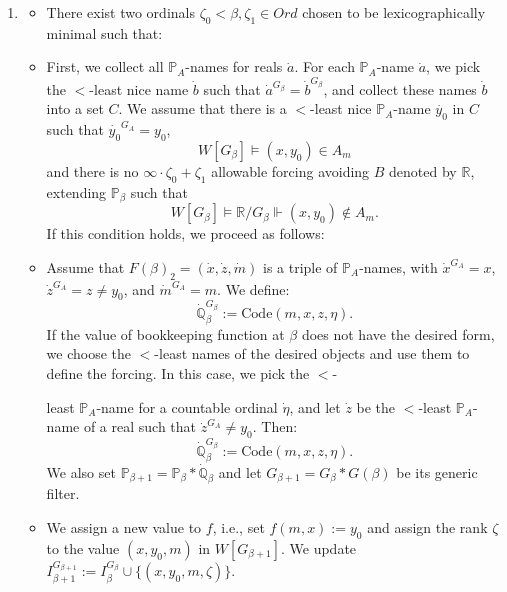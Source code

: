 \documentclass[a4paper,11pt]{article}
\newcommand{\forceP}{\mathbb{P}}
\newcommand{\forceQ}{\mathbb{Q}}
\newcommand{\forceR}{\mathbb{R}}
\begin{document}
   \begin{enumerate}
\item[(a)]  
  \begin{itemize}
  \item[] There exist two ordinals  \(\zeta_0< \beta, \zeta_1 \in Ord\) chosen to be lexicographically minimal such that:
  \item[] First, we collect all \( \forceP_A \)-names for reals \( \dot{a} \). For each \( \forceP_A \)-name \( \dot{a} \), we pick the \( < \)-least nice name \( \dot{b} \) such that \( \dot{a}^{G_{\beta}} = \dot{b}^{G_{\beta}} \), and collect these names \( \dot{b} \) into a set \( C \). We assume that there is a \( < \)-least nice \( \forceP_A \)-name \( \dot{y_0} \) in \( C \) such that \( \dot{y_0}^{G_A} = y_0 \), 
  \[
  W[G_{\beta}] \models (x, y_0) \in A_m
  \]
  and there is no \( \infty \cdot \zeta_0 + \zeta_1\) \-allowable forcing avoiding $B$ denoted by \( \forceR \), extending \( \forceP_{\beta} \)  such that 
  \[
  W[G_{\beta}] \models \forceR / G_{\beta} \Vdash (x, y_0) \notin A_m.
  \]
  If this condition holds, we proceed as follows:
  \end{itemize}

  \begin{itemize}
  \item Assume that \( F(\beta)_2 = (\dot{x}, \dot{z}, \dot{m}) \) is a triple of \( \forceP_A \)-names, with \( \dot{x}^{G_A} = x \), \( \dot{z}^{G_A} = z \neq y_0 \), and \( \dot{m}^{G_A} = m \). We define:
  \[
  \dot{\forceQ}_{\beta}^{G_{\beta}} := \text{Code}(m,x,z,\eta).
  \]
  If the value of bookkeeping function at $\beta$ does not have the desired form, we choose the \( < \)-least names of the desired objects and use them to define the forcing. In this case, we pick the \( < \)-

least \( \forceP_A \)-name for a countable ordinal \( \dot{\eta} \), and let \( \dot{z} \) be the \( < \)-least \( \forceP_A \)-name of a real such that \( \dot{z}^{G_A} \neq y_0 \). Then:
  \[
  \dot{\forceQ}_{\beta}^{G_{\beta}} := \text{Code}(m,x,z,\eta).
  \]
  We also set \( \forceP_{\beta+1} = \forceP_{\beta} \ast \dot{\forceQ}_{\beta} \) and let \( G_{\beta+1} = G_{\beta} \ast G(\beta) \) be its generic filter.

  \item We assign a new value to \( f \), i.e., set \( f(m, x) := y_0 \) and assign the rank \( \zeta \) to the value \( (x, y_0, m) \) in \( W[G_{\beta+1}] \). We update \( I_{\beta+1}^{G_{\beta+1}} := I_{\beta}^{G_{\beta}} \cup \{ (x, y_0,m, \zeta) \} \).
  \end{itemize}


\end{enumerate}
\end{document}
